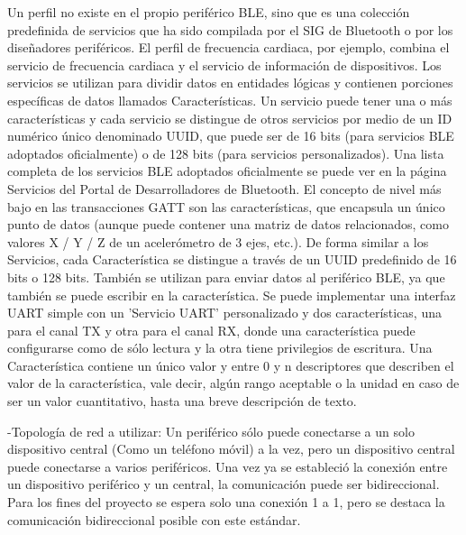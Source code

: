 Un perfil no existe en el propio periférico BLE, sino que es una colección predefinida de servicios que ha sido compilada por el SIG de Bluetooth o por los diseñadores periféricos. El perfil de frecuencia cardiaca, por ejemplo, combina el servicio de frecuencia cardiaca y el servicio de información de dispositivos.\newpage
Los servicios se utilizan para dividir datos en entidades lógicas y contienen porciones específicas de datos llamados Características. Un servicio puede tener una o más características y cada servicio se distingue de otros servicios por medio de un ID numérico único denominado UUID, que puede ser de 16 bits (para servicios BLE adoptados oficialmente) o de 128 bits (para servicios personalizados). Una lista completa de los servicios BLE adoptados oficialmente se puede ver en la página Servicios del Portal de Desarrolladores de Bluetooth.\newline \newline
El concepto de nivel más bajo en las transacciones GATT son las características, que encapsula un único punto de datos (aunque puede contener una matriz de datos relacionados, como valores X / Y / Z de un acelerómetro de 3 ejes, etc.). De forma similar a los Servicios, cada Característica se distingue a través de un UUID predefinido de 16 bits o 128 bits. También se utilizan para enviar datos al periférico BLE, ya que también se puede escribir en la característica. Se puede implementar una interfaz UART simple con un 'Servicio UART' personalizado y dos características, una para el canal TX y otra para el canal RX, donde una característica puede configurarse como de sólo lectura y la otra tiene privilegios de escritura.
Una Característica contiene un único valor y entre 0 y n descriptores que describen el valor de la característica, vale decir, algún rango aceptable o la unidad en caso de ser un valor cuantitativo, hasta una breve descripción de texto. \newpage

-Topología de red a utilizar: Un periférico sólo puede conectarse a un solo dispositivo central (Como un teléfono móvil) a la vez, pero un dispositivo central puede conectarse a varios periféricos. Una vez ya se estableció la conexión entre un dispositivo periférico y un central, la comunicación puede ser bidireccional. Para los fines del proyecto se espera solo una conexión 1 a 1, pero se destaca la comunicación bidireccional posible con este estándar.

